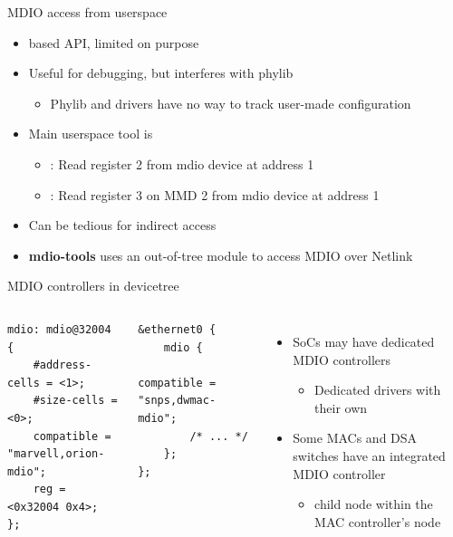 \begin{frame}{MDIO access from userspace}
	\begin{itemize}
		\item {} based API, limited on purpose
		\item Useful for debugging, but interferes with phylib
			\begin{itemize}
				\item Phylib and drivers have no way to track user-made configuration
			\end{itemize}
		\item Main userspace tool is 
			\begin{itemize}
				\item {} : Read register 2 from mdio device at address 1
				\item {} : Read register 3 on MMD 2 from mdio device at address 1
			\end{itemize}
		\item Can be tedious for indirect access
		\item \textbf{mdio-tools} uses an out-of-tree module to access MDIO over Netlink
	\end{itemize}
\end{frame}

\begin{frame}[fragile]{MDIO controllers in devicetree}
	\begin{columns}
		\begin{block}{}
		{\fontsize{9}{10}
			\begin{verbatim}
mdio: mdio@32004 {
    #address-cells = <1>;
    #size-cells = <0>;
    compatible = "marvell,orion-mdio";
    reg = <0x32004 0x4>;
};
			\end{verbatim}
		}
		\end{block}

		\begin{block}{}
			{\fontsize{9}{10}
			\begin{verbatim}
&ethernet0 {
    mdio {
        compatible = "snps,dwmac-mdio";
        /* ... */
    };
};
			\end{verbatim}
			}
		\end{block}
		\begin{itemize}
			\item SoCs may have dedicated MDIO controllers
				\begin{itemize}
					\item Dedicated drivers with their own 
				\end{itemize}
			\item Some MACs and DSA switches have an integrated MDIO controller
				\begin{itemize}
					\item {} child node within the MAC controller's node
				\end{itemize}
		\end{itemize}
	\end{columns}
\end{frame}

